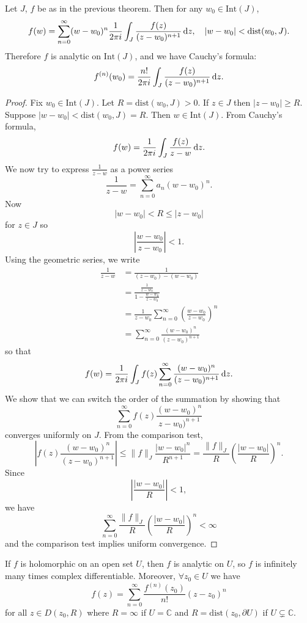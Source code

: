 \begin{theorem}
Let $J$, $f$ be as in the previous theorem. Then for any
$w_0 \in \mathrm{Int}(J)$,
$$
f(w) =
\sum_{n=0}^\infty
  (w - w_0)^n
  \frac{1}{2 \pi i}
  \int_J
    \frac{f(z)}{(z - w_0)^{n+1}}
    \mathop{}\!\mathrm{d} z, \quad
|w - w_0| < \mathrm{dist}(w_0, J).
$$
Therefore $f$ is analytic on $\mathrm{Int}(J)$, and
we have Cauchy's formula:
$$
f^{(n)}(w_0) =
\frac{n!}{2 \pi i}
\int_J
  \frac{f(z)}{(z - w_0)^{n+1}}
  \mathop{}\!\mathrm{d} z.
$$
\end{theorem}
\begin{proof}
Fix $w_0 \in \mathrm{Int}(J)$. Let $R = \mathrm{dist}(w_0, J) > 0$.
If $z \in J$ then $|z - w_0| \geq R$. Suppose
$|w - w_0| < \mathrm{dist}(w_0, J) = R$. Then
$w \in \mathrm{Int}(J)$. From Cauchy's formula,
$$
f(w) = \frac{1}{2 \pi i} \int_J \frac{f(z)}{z - w} \mathop{}\!\mathrm{d} z.
$$
We now try to express $\frac{1}{z - w}$ as a power series
$$
\frac{1}{z - w} = \sum_{n=0}^\infty a_n (w - w_0)^n.
$$
Now
$$
|w - w_0| < R \leq |z - w_0|
$$
for $z \in J$ so
$$
\left|\frac{w - w_0}{z - w_0}\right| < 1.
$$
Using the geometric series, we write
\begin{align*}
   \frac{1}{z - w}
&= \frac{1}{(z - w_0) - (w - w_0)} \\
&= \frac{\frac{1}{z - w_0}}{1 - \frac{w - w_0}{z - w_0}} \\
&= \frac{1}{z - w_0}
   \sum_{n=0}^\infty
     \left(
       \frac{w - w_0}{z - w_0}
     \right)^n \\
&= \sum_{n=0}^\infty
     \frac{(w - w_0)^n}{(z - w_0)^{n+1}}
\end{align*}
so that
$$
f(w) =
\frac{1}{2 \pi i}
\int_J
  f(z)
  \sum_{n=0}^\infty
    \frac{(w - w_0)^n}{(z - w_0)^{n+1}}
    \mathop{}\!\mathrm{d} z.
$$
We show that we can switch the order of the summation
by showing that
$$
\sum_{n=0}^\infty f(z) \frac{(w - w_0)^n}{z - w_0)^{n+1}}
$$
converges uniformly on $J$.
From the comparison test,
$$
\left|
  f(z) \frac{(w - w_0)^n}{(z - w_0)^{n+1}}
\right|
\leq
\| f \|_J
\frac{|w - w_0|^n}{R^{n+1}}
=
\frac{\| f \|_J}{R}
\left(\frac{|w - w_0|}{R}\right)^n.
$$
Since
$$
\left|
  \frac{|w - w_0|}{R}
\right|
< 1,
$$
we have
$$
\sum_{n=0}^\infty
  \frac{\| f \|_J}{R}
  \left(\frac{|w - w_0|}{R}\right)^n
< \infty
$$
and the comparison test implies uniform convergence.
\end{proof}

\begin{corol}
If $f$ is holomorphic on an open set $U$, then $f$ is analytic on $U$,
so $f$ is infinitely many times complex differentiable. Moreover,
$\forall z_0 \in U$ we have
$$
f(z) = \sum_{n=0}^\infty \frac{f^{(n)}(z_0)}{n!} (z - z_0)^n
$$
for all $z \in D(z_0, R)$ where $R = \infty$ if $U = \mathbb{C}$ and
$R = \mathrm{dist}(z_0, \partial U)$ if $U \subsetneq \mathbb{C}$.
\end{corol}

